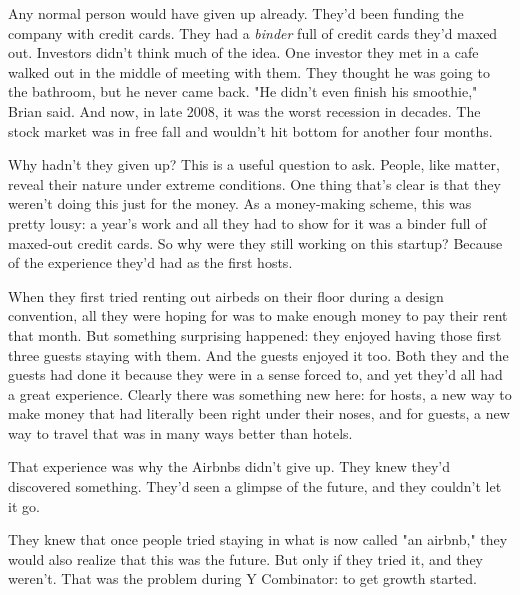 Any
                  normal person would have given up already. They'd been funding
                  the company with credit cards. They had a \emph{binder} full
                  of credit cards they'd maxed out. Investors didn't think much
                  of the idea. One investor they met in a cafe walked out in the
                  middle of meeting with them. They thought he was going to the
                  bathroom, but he never came back. "He didn't even finish his
                  smoothie," Brian said. And now, in late 2008, it was the worst
                  recession in decades. The stock market was in free fall and
                  wouldn't hit bottom for another four months.

Why
                  hadn't they given up? This is a useful question to ask.
                  People, like matter, reveal their nature under extreme
                  conditions. One thing that's clear is that they weren't doing
                  this just for the money. As a money-making scheme, this was
                  pretty lousy: a year's work and all they had to show for it
                  was a binder full of maxed-out credit cards. So why were they
                  still working on this startup? Because of the experience
                  they'd had as the first hosts.

When they first
                  tried renting out airbeds on their floor during a design
                  convention, all they were hoping for was to make enough money
                  to pay their rent that month. But something surprising
                  happened: they enjoyed having those first three guests staying
                  with them. And the guests enjoyed it too. Both they and the
                  guests had done it because they were in a sense forced to, and
                  yet they'd all had a great experience. Clearly there was
                  something new here: for hosts, a new way to make money that
                  had literally been right under their noses, and for guests, a
                  new way to travel that was in many ways better than hotels.

That
                  experience was why the Airbnbs didn't give up. They knew
                  they'd discovered something. They'd seen a glimpse of the
                  future, and they couldn't let it go.

They knew that
                  once people tried staying in what is now called "an airbnb,"
                  they would also realize that this was the future. But only if
                  they tried it, and they weren't. That was the problem during Y
                  Combinator: to get growth started.

